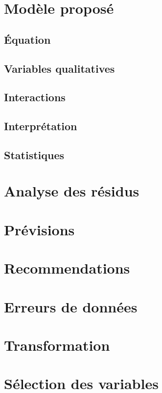 \documentclass{article}\usepackage[]{graphicx}\usepackage[]{color}
\begin{document}
\section{Modèle proposé}
\label{sec:modele}

\subsection{Équation}
\label{ssec:equation}

\subsection{Variables qualitatives}
\label{ssec:var_qual}

\subsection{Interactions}
\label{ssec:interaction}

\subsection{Interprétation}
\label{ssec:interpretation}

\subsection{Statistiques}
\label{ssec:stats}

\section{Analyse des résidus}
\label{sec:analyse}

\section{Prévisions}
\label{sec:prev}

\section{Recommendations}


\begin{appendices}
\section{Erreurs de données}

\section{Transformation}

\section{Sélection des variables}
\end{appendices}
\end{document}
